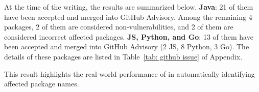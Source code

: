 At the time of the writing,  the results are summarized below. \textbf{Java}: 21 of them have been accepted and merged into GitHub Advisory. Among the remaining 4 packages, 2 of them are considered non-vulnerabilities, and 2 of them are considered incorrect affected packages. \textbf{JS, Python, and Go}: 13 of them have been accepted and merged into GitHub Advisory (2 JS, 8 Python, 3 Go). The details of these packages are listed in Table~\ref{tab: github issue} of Appendix. 

This result highlights the real-world performance of \detector{} in automatically identifying affected package names. 







